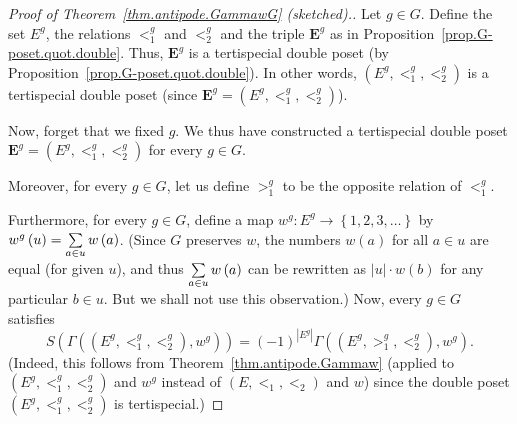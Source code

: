 \documentclass[12pt]{article}
\theoremstyle{plain}
\theoremstyle{definition}
\theoremstyle{remark}
\let\sumnonlimits\sum
\renewcommand{\sum}{\sumnonlimits\limits}
\newcommand{\EE}{{\mathbf{E}}}
\begin{document}
\begin{proof}
[Proof of Theorem~\ref{thm.antipode.GammawG} (sketched).]Let $g\in G$.
Define the set $E^g$, the relations $<_1^g$ and $<_2^g$
and the triple $\EE^g$ as in Proposition~\ref{prop.G-poset.quot.double}.
Thus, $\EE^g$ is a tertispecial double poset (by
Proposition~\ref{prop.G-poset.quot.double}). In other words,
$\left( E^g, <_1^g, <_2^g \right)$ is a tertispecial double poset
(since $\EE^g = \left( E^g, <_1^g, <_2^g \right)$).

Now, forget that we fixed $g$. We thus have constructed a
tertispecial double poset
$\EE^g = \left( E^g, <_1^g, <_2^g \right)$ for every $g \in G$.

Moreover, for every $g \in G$, let us define $>_1^g$ to be the
opposite relation of $<_1^g$.

Furthermore, for every $g\in G$, define a map $w^{g}:E^{g}\rightarrow
\left\{1,2,3,\ldots\right\}$
by $w^{g}\left(  u\right)  =\sum\limits_{a\in u}w\left(
a\right)  $. (Since $G$ preserves $w$, the numbers $w\left(  a\right)  $ for
all $a\in u$ are equal (for given $u$), and thus $\sum\limits_{a\in u}w\left(
a\right)  $ can be rewritten as $\left\vert u\right\vert \cdot w\left(
b\right)  $ for any particular $b\in u$. But we shall not use
this observation.)
Now, every $g \in G$ satisfies
\begin{equation}
S\left(  \Gamma\left(  \left(  E^{g},<_{1}^{g},<_{2}^{g}\right)
,w^{g}\right)  \right)  =\left(  -1\right)  ^{\left\vert E^{g}\right\vert
}\Gamma\left(  \left(  E^{g},>_{1}^{g},<_{2}^{g}\right)  ,w^{g}\right) .
\label{pf.thm.antipode.GammawG.S1}
\end{equation}
(Indeed, this follows from Theorem~\ref{thm.antipode.Gammaw}
(applied to $\left( E^g, <_1^g, <_2^g \right)$ and $w^g$
instead of $\left( E, <_1, <_2 \right)$ and $w$)
since the double poset
$\left( E^g, <_1^g, <_2^g \right)$ is tertispecial.)


\end{proof}
\end{document}
